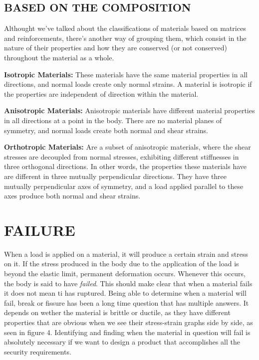 \documentclass[letterpaper]{article}
\begin{document}
\begin{multicols}{2}
	\subsection*{BASED ON THE COMPOSITION}
	Althought we've talked about the classifications of materials based on matrices and reinforcements, there's another way of grouping them, which consist in the nature of their properties and how they are conserved (or not conserved) throughout the material as a whole.
	
	\textbf{Isotropic Materials:} These materials have the same material properties in all directions, and normal loads create only normal strains. A material is isotropic if the properties are independent of direction within the material.

	\textbf{Anisotropic Materials:} Anisotropic materials have different material properties in all directions at a point in the body. There are no material planes of symmetry, and normal loads create both normal and shear strains.\supercite{campbell10}

	\textbf{Orthotropic Materials:} Are a subset of anisotropic materials, where the shear stresses are decoupled from normal stresses, exhibiting different stiffnesses in three orthogonal directions. \supercite{li14} In other words, the properties these materials have are different in three mutually perpendicular directions. They have three mutually perpendicular axes of symmetry, and a load applied parallel to these axes produce both normal and shear strains.
	
	\section{FAILURE}
	When a load is applied on a material, it will produce a certain strain and stress on it. If the stress produced in the body due to the application of the load is beyond the elastic limit, permanent deformation occurs. Whenever this occurs, the body is said to have \textit{failed}. This should make clear that when a material fails it does not mean ti has ruptured.
	Being able to determine when a material will fail, break or fissure has been a long time question that has multiple answers. It depends on wether the material is brittle or ductile, as they have different properties that are obvious when we see their stress-strain graphs side by side, as seen in figure 4. Identifying and finding when the material in question will fail is absolutely necessary if we want to design a product that accomplishes all the security requirements.
	

\end{multicols}
\end{document}
